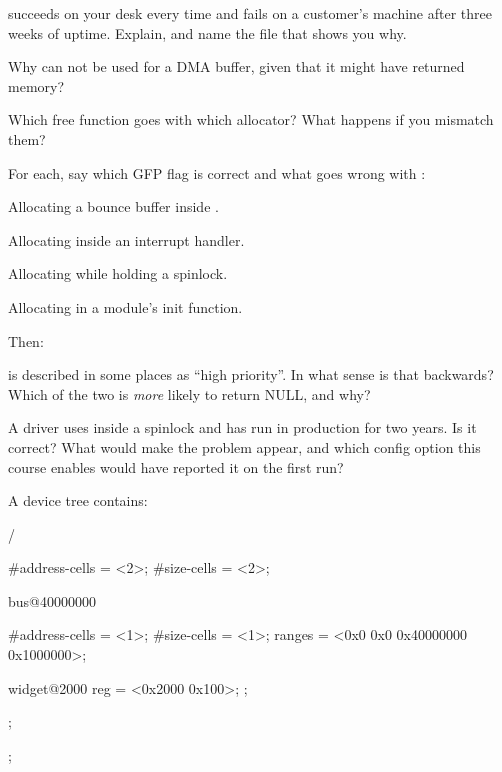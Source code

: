   succeeds on your desk every time and fails on a
customer's machine after three weeks of uptime. Explain, and name the file that shows you why.

 Why can  not be used for a DMA buffer, given that it might have returned
 memory?

 Which free function goes with which allocator? What happens if you mismatch them?

\label{c6:ex:3}

For each, say which GFP flag is correct and what goes wrong with :

 Allocating a bounce buffer inside .

 Allocating inside an interrupt handler.

 Allocating while holding a spinlock.

 Allocating in a module's init function.

Then:

  is described in some places as ``high priority''. In what sense is that
backwards? Which of the two is \emph{more} likely to return NULL, and why?

 A driver uses  inside a spinlock and has run in production for two years.
Is it correct? What would make the problem appear, and which config option this course enables would
have reported it on the first run?

\label{c6:ex:4}

A device tree contains:

\begin{console}
/ {
        #address-cells = <2>;
        #size-cells = <2>;

        bus@40000000 {
                #address-cells = <1>;
                #size-cells = <1>;
                ranges = <0x0 0x0 0x40000000 0x1000000>;

                widget@2000 {
                        reg = <0x2000 0x100>;
                };
        };
};
\end{console}


